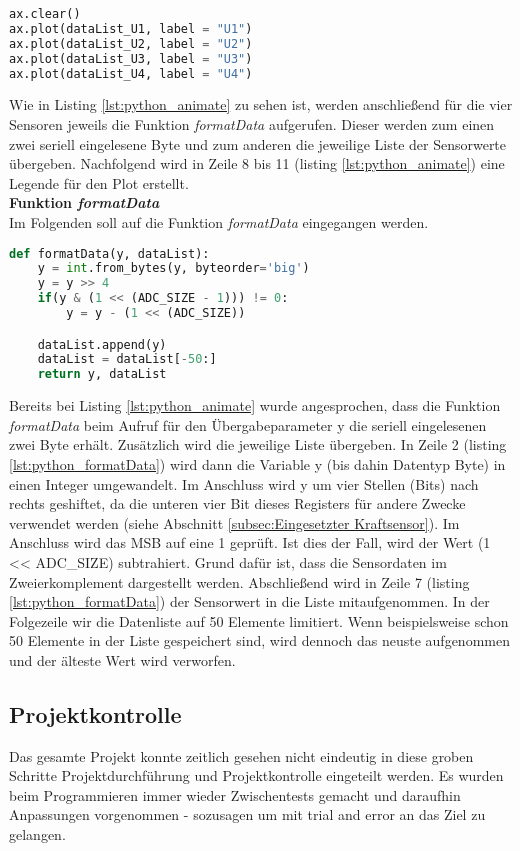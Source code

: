 \documentclass[
	letterpaper, %
	10pt, %
]{CSUniSchoolLabReport}
\begin{document}
\begin{spacing}{1.6}
\begin{lstlisting}[caption={Aufrufen der Funktion \textit{formatData} und labeln der Achsen im \textsc{Python}-Skript aus dem Projekt Kraftsensor},label={lst:python_animate},language=python]
ax.clear()
ax.plot(dataList_U1, label = "U1")
ax.plot(dataList_U2, label = "U2")
ax.plot(dataList_U3, label = "U3")
ax.plot(dataList_U4, label = "U4")
\end{lstlisting}
Wie in Listing \ref{lst:python_animate} zu sehen ist, werden anschließend für die vier Sensoren jeweils die Funktion \textit{formatData} aufgerufen. Dieser werden zum einen zwei seriell eingelesene Byte und zum anderen die jeweilige Liste der Sensorwerte übergeben.
Nachfolgend wird in Zeile 8 bis 11 (listing \ref{lst:python_animate}) eine Legende für den Plot erstellt.\\

\textbf{Funktion \textit{formatData}\\}
Im Folgenden soll auf die Funktion \textit{formatData} eingegangen werden.
\begin{lstlisting}[caption={Funktion \textit{formatData} im \textsc{Python}-Skript aus dem Projekt Kraftsensor},label={lst:python_formatData},language=python]
def formatData(y, dataList):
    y = int.from_bytes(y, byteorder='big')
    y = y >> 4
    if(y & (1 << (ADC_SIZE - 1))) != 0:
        y = y - (1 << (ADC_SIZE))

    dataList.append(y)
    dataList = dataList[-50:]
    return y, dataList
\end{lstlisting}
Bereits bei Listing \ref{lst:python_animate} wurde angesprochen, dass die Funktion \textit{formatData} beim Aufruf für den Übergabeparameter y die seriell eingelesenen zwei Byte erhält. Zusätzlich wird die jeweilige Liste übergeben. In Zeile 2 (listing \ref{lst:python_formatData}) wird dann die Variable y (bis dahin Datentyp Byte) in einen Integer umgewandelt. Im Anschluss wird y um vier Stellen (Bits) nach rechts geshiftet, da die unteren vier Bit dieses Registers für andere Zwecke verwendet werden (siehe Abschnitt \ref{subsec:Eingesetzter Kraftsensor}). Im Anschluss wird das MSB auf eine 1 geprüft. Ist dies der Fall, wird der Wert (1 << ADC\_SIZE) subtrahiert. Grund dafür ist, dass die Sensordaten im Zweierkomplement dargestellt werden.
Abschließend wird in Zeile 7 (listing \ref{lst:python_formatData}) der Sensorwert in die Liste mitaufgenommen. In der Folgezeile wir die Datenliste auf 50 Elemente limitiert. Wenn beispielsweise schon 50 Elemente in der Liste gespeichert sind, wird dennoch das neuste aufgenommen und der älteste Wert wird verworfen.

\newpage
\subsection{Projektkontrolle}
Das gesamte Projekt konnte zeitlich gesehen nicht eindeutig in diese groben Schritte \glqq Projektdurchführung\grqq $ $ und \glqq Projektkontrolle\grqq $ $ eingeteilt werden. Es wurden beim Programmieren immer wieder Zwischentests gemacht und daraufhin Anpassungen vorgenommen - sozusagen um mit \glqq trial and error\grqq $ $ an das Ziel zu gelangen.

\end{spacing}
\end{document}
